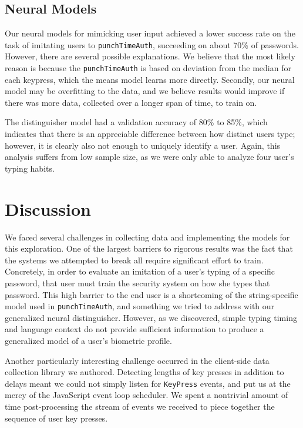 \documentclass[9pt,journal]{IEEEtran}
\begin{document}
\subsection{Neural Models}

Our neural models for mimicking user input achieved a lower success rate on the task of imitating users to \texttt{punchTimeAuth}, succeeding on about 70\% of passwords. However, there are several possible explanations. We believe that the most likely reason is because the \texttt{punchTimeAuth} is based on deviation from the median for each keypress, which the means model learns more directly. Secondly, our neural model may be overfitting to the data, and we believe results would improve if there was more data, collected over a longer span of time, to train on.

The distinguisher model had a validation accuracy of 80\% to 85\%, which indicates that there is an appreciable difference between how distinct users type; however, it is clearly also not enough to uniquely identify a user. Again, this analysis suffers from low sample size, as we were only able to analyze four user's typing habits.

\section{Discussion}

We faced several challenges in collecting data and implementing the models for this exploration. One of the largest barriers to rigorous results was the fact that the systems we attempted to break all require significant effort to train. Concretely, in order to evaluate an imitation of a user's typing of a specific password, that user must train the security system on how she types that password. This high barrier to the end user is a shortcoming of the string-specific model used in \texttt{punchTimeAuth}, and something we tried to address with our generalized neural distinguisher. However, as we discovered, simple typing timing and language context do not provide sufficient information to produce a generalized model of a user's biometric profile.

Another particularly interesting challenge occurred in the client-side data collection library we authored. Detecting lengths of key presses in addition to delays meant we could not simply listen for \texttt{KeyPress} events, and put us at the mercy of the JavaScript event loop scheduler. We spent a nontrivial amount of time post-processing the stream of events we received to piece together the sequence of user key presses.
\end{document}
